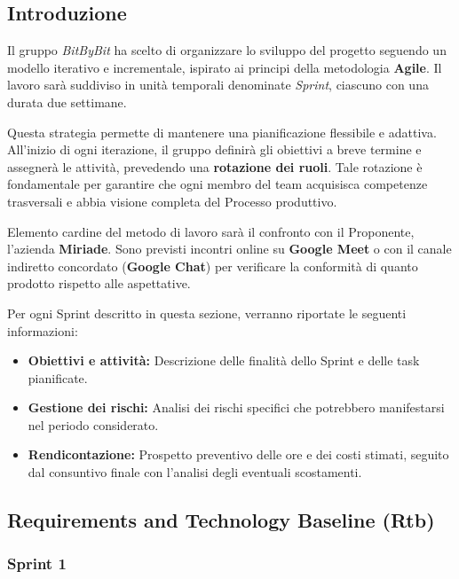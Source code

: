 \documentclass[a4paper,12pt]{article}
\begin{document}
\subsection{Introduzione}
Il gruppo \textit{BitByBit} ha scelto di organizzare lo sviluppo del progetto seguendo un modello iterativo e incrementale, ispirato ai principi della metodologia \textbf{Agile}. Il lavoro sarà suddiviso in unità temporali denominate \textit{Sprint}, ciascuno con una durata due settimane.

Questa strategia permette di mantenere una pianificazione flessibile e adattiva. All'inizio di ogni iterazione, il gruppo definirà gli obiettivi a breve termine e assegnerà le attività, prevedendo una \textbf{rotazione dei ruoli}. Tale rotazione è fondamentale per garantire che ogni membro del team acquisisca competenze trasversali e abbia visione completa del Processo produttivo.

Elemento cardine del metodo di lavoro sarà il confronto con il Proponente, l'azienda \textbf{Miriade}. Sono previsti incontri online su \textbf{Google Meet} o con il canale indiretto concordato (\textbf{Google Chat}) per verificare la conformità di quanto prodotto rispetto alle aspettative.

Per ogni Sprint descritto in questa sezione, verranno riportate le seguenti informazioni:
\begin{itemize}
    \item \textbf{Obiettivi e attività:} Descrizione delle finalità dello Sprint e delle task pianificate.
    \item \textbf{Gestione dei rischi:} Analisi dei rischi specifici che potrebbero manifestarsi nel periodo considerato.
    \item \textbf{Rendicontazione:} Prospetto preventivo delle ore e dei costi stimati, seguito dal consuntivo finale con l'analisi degli eventuali scostamenti.
\end{itemize}

\subsection{Requirements and Technology Baseline (Rtb)}

\subsubsection{Sprint 1}\label{sec:sprint1_RTB}
\end{document}
